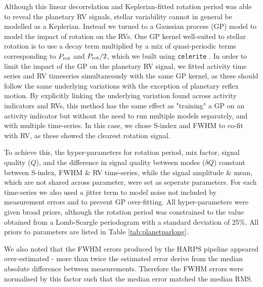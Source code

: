 \documentclass[fleqn,usenatbib]{mnras}
\newcommand{\harps}{{HARPS}}
\begin{document}
Although this linear decorrelation and Keplerian-fitted rotation period was able to reveal the planetary RV signals, stellar variability cannot in general be modelled as a Keplerian.
Instead we turned to a Gaussian process (GP) model to model the impact of rotation on the RVs.
One GP kernel well-suited to stellar rotation is to use a decay term multiplied by a mix of quasi-periodic terms corresponding to $P_{\rm rot}$ and $P_{\rm rot}/2$, which we built using \texttt{celerite} \citep{foreman2017fast}.
In order to limit the impact of the GP on the planetary RV signal, we fitted activity time series and RV timeseries simultaneously with the same GP kernel, as these should follow the same underlying variations with the exception of planetary reflex motion.
By explicitly linking the underlying variation found across activity indicators and RVs, this method has the same effect as "training" a GP on an activity indicator but without the need to run multiple models separately, and with multiple time-series.
In this case, we chose S-index and FWHM to co-fit with RV, as these showed the clearest rotation signal.

To achieve this, the hyper-parameters for rotation period, mix factor, signal quality ($Q$), and the difference in signal quality between modes ($\delta Q$) constant between S-index, FWHM \& RV time-series, while the signal amplitude \& mean, which are not shared across parameter, were set as seperate parameters.
For each time-series we also used a jitter term to model noise not included by measurement errors and to prevent GP over-fitting.
All hyper-parameters were given broad priors, although the rotation period was constrained to the value obtained from a Lomb-Scargle periodogram with a standard deviation of 25\%.
All priors to parameters are listed in Table \ref{tab:planetparlong}.

We also noted that the FWHM errors produced by the \harps{} pipeline appeared over-estimated - more than twice the estimated error derive from the median absolute difference between measurements.
Therefore the FWHM errors were normalised by this factor such that the median error matched the median RMS.
\end{document}
